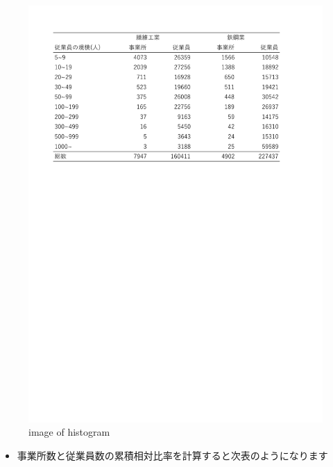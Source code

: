 \documentclass[
]{book}
\providecommand{\tightlist}{%
  \setlength{\itemsep}{0pt}\setlength{\parskip}{0pt}}
\theoremstyle{definition}
\theoremstyle{definition}
\theoremstyle{definition}
\theoremstyle{definition}
\theoremstyle{remark}
\begin{document}
\begin{figure}
\centering
\includegraphics[width=1\textwidth,height=\textheight]{images/lec04/tab_textile_steel1.pdf}
\caption{image of histogram}
\end{figure}

\begin{itemize}
\tightlist
\item
  事業所数と従業員数の累積相対比率を計算すると次表のようになります
\end{itemize}
\end{document}
